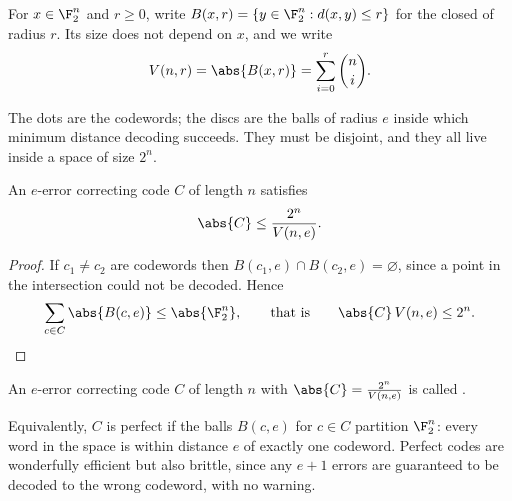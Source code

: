 \begin{definition}
	For $x \in \F_2^n$ and $r \ge 0$, write $B(x,r) = \{y \in \F_2^n : d(x,y) \le r\}$ for the closed  of radius $r$. Its size does not depend on $x$, and we write
	$$V(n,r) = \abs{B(x,r)} = \sum_{i=0}^{r}\binom{n}{i}.$$
\end{definition}

\begin{center}
\end{center}

The dots are the codewords; the discs are the balls of radius $e$ inside which minimum distance decoding succeeds. They must be disjoint, and they all live inside a space of size $2^n$.

\begin{lemma}\label{lem:hamming}
	An $e$-error correcting code $C$ of length $n$ satisfies
	$$\abs{C} \le \frac{2^n}{V(n,e)}.$$
\end{lemma}

\begin{proof}
	If $c_1 \ne c_2$ are codewords then $B(c_1,e) \cap B(c_2,e) = \varnothing$, since a point in the intersection could not be decoded. Hence
	$$\sum_{c \in C} \abs{B(c,e)} \le \abs{\F_2^n}, \qquad \text{that is} \qquad \abs{C}\,V(n,e) \le 2^n. \qedhere$$
\end{proof}

\begin{definition}
	An $e$-error correcting code $C$ of length $n$ with $\abs{C} = \frac{2^n}{V(n,e)}$ is called .
\end{definition}

\begin{remark}
	Equivalently, $C$ is perfect if the balls $B(c,e)$ for $c \in C$ partition $\F_2^n$: every word in the space is within distance $e$ of exactly one codeword. Perfect codes are wonderfully efficient but also brittle, since any $e+1$ errors are guaranteed to be decoded to the wrong codeword, with no warning.
\end{remark}

